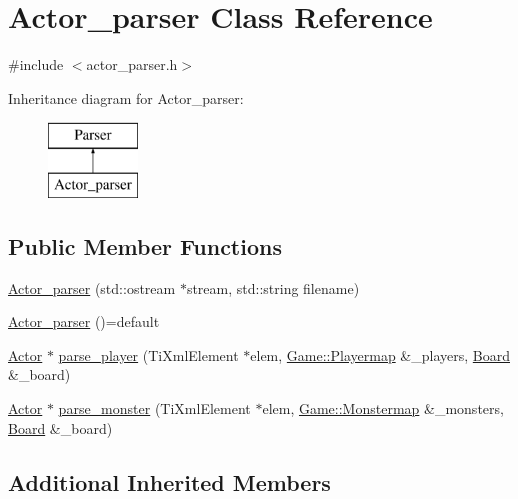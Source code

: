 \hypertarget{class_actor__parser}{\section{Actor\-\_\-parser Class Reference}
\label{class_actor__parser}
}


{\ttfamily \#include $<$actor\-\_\-parser.\-h$>$}

Inheritance diagram for Actor\-\_\-parser\-:\begin{figure}[H]
\begin{center}
\leavevmode
\includegraphics[height=2.000000cm]{class_actor__parser}
\end{center}
\end{figure}
\subsection*{Public Member Functions}
\begin{DoxyCompactItemize}
\item 
\hyperlink{class_actor__parser_ac313d2d8f57b99a7d207c1fe73d6dcdc}{Actor\-\_\-parser} (std\-::ostream $\ast$stream, std\-::string filename)
\item 
\hyperlink{class_actor__parser_a663d1598bbe15d136c86ac198d989eb0}{Actor\-\_\-parser} ()=default
\item 
\hyperlink{class_actor}{Actor} $\ast$ \hyperlink{class_actor__parser_a352d0ccca7a9412a507bd8f304992c98}{parse\-\_\-player} (Ti\-Xml\-Element $\ast$elem, \hyperlink{class_game_a11e553861e3a7fc842680e55171ed06f}{Game\-::\-Playermap} \&\-\_\-players, \hyperlink{class_board}{Board} \&\-\_\-board)
\item 
\hyperlink{class_actor}{Actor} $\ast$ \hyperlink{class_actor__parser_aa8e7ef952116829399ea6fd2f03e47ed}{parse\-\_\-monster} (Ti\-Xml\-Element $\ast$elem, \hyperlink{class_game_a2c39481e575abd66baa206771c504149}{Game\-::\-Monstermap} \&\-\_\-monsters, \hyperlink{class_board}{Board} \&\-\_\-board)
\end{DoxyCompactItemize}
\subsection*{Additional Inherited Members}


